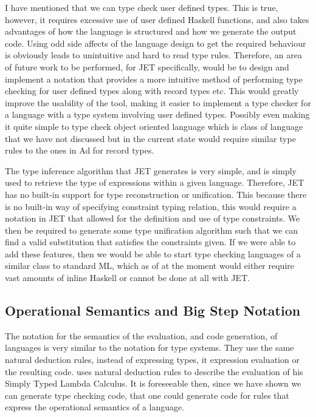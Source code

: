 I have mentioned that we can type check user defined types.
This is true, however, it requires excessive use of user defined Haskell functions, and also takes advantages of how the language is structured and how we generate the output code.
Using odd side affects of the language design to get the required behaviour is obviously leads to unintuitive and hard to read type rules.
Therefore, an area of future work to be performed, for JET specifically, would be to design and implement a notation that provides a more intuitive method of performing type checking for user defined types along with record types etc.
This would greatly improve the usability of the tool, making it easier to implement a type checker for a language with a type system involving user defined types.
Possibly even making it quite simple to type check object oriented language which is class of language that we have not discussed but in the current state would require similar type rules to the ones in Ad for record types.

The type inference algorithm that JET generates is very simple, and is simply used to retrieve the type of expressions within a given language.
Therefore, JET has no built-in support for type reconstruction or unification\cite{pierce2002types,cardelli1996type}.
This because there is no built-in way of specifying constraint typing relation\cite{pierce2002types}, this would require a notation in JET that allowed for the definition and use of type constraints.
We then be required to generate some type unification algorithm such that we can find a valid substitution that satisfies the constraints given. 
If we were able to add these features, then we would be able to start type checking languages of a similar class to standard ML\cite{milner1997definition}, which as of at the moment would either require vast amounts of inline Haskell or cannot be done at all with JET.

\subsection{Operational Semantics and Big Step Notation}
The notation for the semantics of the evaluation, and code generation, of languages is very similar to the notation for type systems.
They use the same natural deduction rules, instead of expressing types, it expression evaluation or the resulting code.
\textcite{pierce2002types} uses natural deduction rules to describe the evaluation of his Simply Typed Lambda Calculus.
It is foreseeable then, since we have shown we can generate type checking code, that one could generate code for rules that express the operational semantics of a language.

